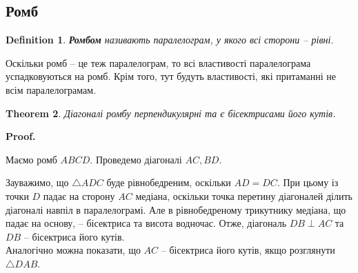 \documentclass[a4paper, 10pt]{article}
\makeatletter
\def\qed{$\blacksquare$}
\theoremstyle{theoremdd}
\newtheorem{theorem}{Theorem}[subsection]
\theoremstyle{theoremdd}
\theoremstyle{theoremdd}
\newtheorem{definition}[theorem]{Definition}
\theoremstyle{theoremdd}
\theoremstyle{theoremdd}
\theoremstyle{theoremdd}
\theoremstyle{theoremdd}
\theoremstyle{theoremdd}
\theoremstyle{theoremdd}
\renewenvironment{proof}[1][Proof.\\]{\par
\pushQED{\hfill \qed}%
\normalfont \topsep6\p@\@plus6\p@\relax
\trivlist
\item\relax
{\bfseries
#1\@addpunct{.}}\hspace\labelsep\ignorespaces
}{%
\popQED\endtrivlist\@endpefalse
}
\makeatother
\begin{document}
\subsection{Ромб}
\begin{definition}
\textbf{Ромбом} називають паралелограм, у якого всі сторони -- рівні.
\begin{figure}[H]
\centering
{}
\end{figure}
\end{definition}

Оскільки ромб -- це теж паралелограм, то всі властивості паралелограма успадковуються на ромб. Крім того, тут будуть властивості, які притаманні не всім паралелограмам.

\begin{theorem}
Діагоналі ромбу перпендикулярні та є бісектрисами його кутів.
\end{theorem}

\begin{proof}
Маємо ромб $ABCD$. Проведемо діагоналі $AC,BD$.
\begin{figure}[H]
\centering
{}
\end{figure}
Зауважимо, що $\triangle ADC$ буде рівнобедреним, оскільки $AD = DC$. При цьому із точки $D$ падає на сторону $AC$ медіана, оскільки точка перетину діагоналей ділить діагоналі навпіл в паралелограмі. Але в рівнобедреному трикутнику медіана, що падає на основу, -- бісектриса та висота водночас. Отже, діагональ $DB \perp AC$ та $DB$ -- бісектриса його кутів.\\
Аналогічно можна показати, що $AC$ -- бісектриса його кутів, якщо розглянути $\triangle DAB$.
\end{proof}
\end{document}
